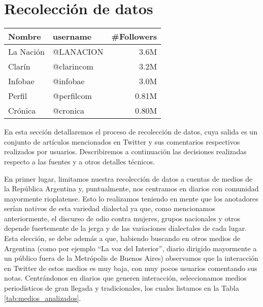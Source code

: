 

\section{Recolección de datos}

\begin{table*}[t]
    \centering
    \large
    \begin{tabular}{ l l r }
        Nombre     &  username          & \#Followers \\
        \hline
        La Nación  &  @LANACION         & 3.6M            \\
        Clarín     &  @clarincom        & 3.2M        \\
        Infobae    &  @infobae          & 3.0M   \\
        Perfil     &  @perfilcom        & 0.81M    \\
        Crónica    &  @cronica          & 0.80M     \\
        \hline
    \end{tabular}
    \caption{Cuentas de medios utilizadas para la recolección de datos, junto a sus nombres de usuarios y la cantidad de seguidores en Twitter (al momento de la recolección)}
    \label{tab:medios_analizados}
\end{table*}


En esta sección detallaremos el proceso de recolección de datos, cuya salida es un conjunto de artículos mencionados en Twitter y sus comentarios respectivos realizados por usuarios. Describiremos a continuación las decisiones realizadas respecto a las fuentes y a otros detalles técnicos.

En primer lugar, limitamos nuestra recolección de datos a cuentas de medios de la República Argentina y, puntualmente, nos centramos en diarios con comunidad mayormente rioplatense. Esto lo realizamos teniendo en mente que los anotadores serían nativos de esta variedad dialectal ya que, como mencionamos anteriormente, el discurso de odio contra mujeres, grupos nacionales y otros depende fuertemente de la jerga y de las variaciones dialectales de cada lugar. Esta elección, se debe además a que, habiendo buscando en otros medios de Argentina (como por ejemplo ``La voz del Interior'', diario dirigido mayormente a un público fuera de la Metrópolis de Buenos Aires) observamos que la interacción en Twitter de estos medios es muy baja, con muy pocos usuarios comentando sus notas. Centrándonos en diarios que generen interacción, seleccionamos medios periodísticos de gran llegada y tradicionales, los cuales listamos en la Tabla \ref{tab:medios_analizados}.

